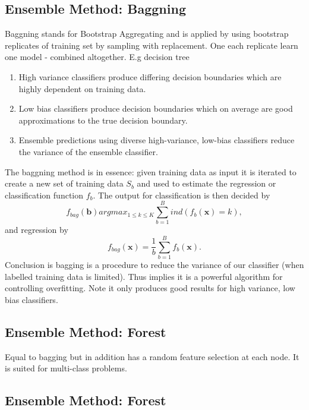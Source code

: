 \documentclass[12pt]{article}
\numberwithin{equation}{section}
\begin{document}
\subsection{Ensemble Method: Baggning}
Baggning stands for Bootstrap Aggregating and is applied by using bootstrap replicates of training set by sampling with replacement. One each replicate learn one model - combined altogether. E.g decision tree 
\begin{enumerate}
\item
High variance classifiers produce differing decision boundaries which are highly dependent on training data.
\item Low bias classifiers produce decision boundaries which on average are good approximations to the true decision boundary.
\item Ensemble predictions using diverse high-variance, low-bias classifiers reduce the variance of the ensemble classifier. 
\end{enumerate}
The baggning method is in essence: given training data as input it is iterated to create a new set of training data $S_{b}$ and used to estimate the regression or classification function $f_{b}$. The output for classification is then decided by
\begin{equation}
f_{bag}(\bm{b}) argmax_{1\leq k \leq K} \sum_{b=1}^{B} ind(f_{b}(\bm{x})= k),
\end{equation}
and regression by
\begin{equation}
f_{bag}(\bm{x}) = \frac{1}{b} \sum_{b=1}^{B} f_{b}(\bm{x}).
\end{equation}
Conclusion is bagging is a procedure to reduce the variance of our classifier (when labelled training data is limited). Thus implies it is a powerful algorithm for controlling overfitting. Note it only produces good results for high variance, low bias classifiers.

\subsection{Ensemble Method: Forest}
Equal to bagging but in addition has a random feature selection at each node. It is suited for multi-class problems.

\subsection{Ensemble Method: Forest}
\end{document}

